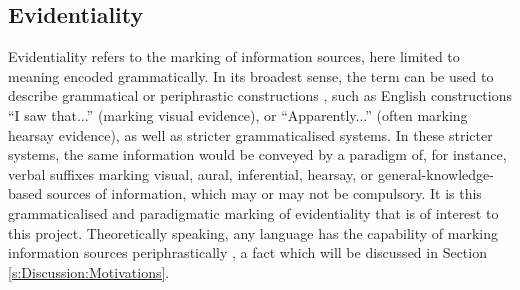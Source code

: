 \subsection{Evidentiality}\label{s:Intro:EvidentialityIntro}
Evidentiality refers to the marking of information sources, here limited to meaning encoded grammatically. In its broadest sense, the term can be used to describe grammatical or periphrastic constructions \cite{SanRoque2019Evidentiality}, such as English constructions ``I saw that...'' (marking visual evidence), or ``Apparently...'' (often marking hearsay evidence), as well as stricter grammaticalised systems. In these stricter systems, the same information would be conveyed by a paradigm of, for instance, verbal suffixes marking visual, aural, inferential, hearsay, or general-knowledge-based sources of information, which may or may not be compulsory. It is this grammaticalised and paradigmatic marking of evidentiality that is of interest to this project. Theoretically speaking, any language has the capability of marking information sources periphrastically \cite{SanRoque2019Evidentiality}, a fact which will be discussed in Section \ref{s:Discussion:Motivations}.

